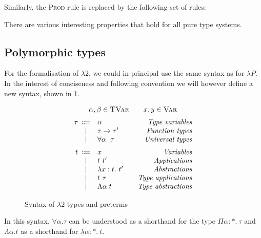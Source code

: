Similarly, the \textsc{Prod} rule is replaced by the following set of rules:
\begin{center}
    \begin{prooftreecustom}
    \end{prooftreecustom}
\end{center}\vspace{1mm}

There are various interesting properties that hold for all pure type systems.


\subsection{Polymorphic types}
For the formalisation of $\lambda 2$, we could in principal use the same syntax as for $\lambda P$.
In the interest of conciseness and following convention we will however define a new syntax,
shown in \cref{fig:polymorphic-types-terms-syntax}.

\begin{figure}[htbp]
    \[
    \begin{array}{r@{\hspace{.5em}}cl@{\hspace{2em}}r}
        \multicolumn{4}{c}{\alpha, \beta \in \textsc{TVar} \quad\quad x,y \in \textsc{Var}} \br
        \tau & \Coloneqq & \alpha & \emph{Type variables} \\
        & | & \tau \to \tau' & \emph{Function types} \\
        & | & \forall \alpha.\ \tau & \emph{Universal types} \br
        t & \Coloneqq & x & \emph{Variables} \\
        & | & t\ t' & \emph{Applications} \\
        & | & \lambda x: t.\ t' & \emph{Abstractions} \\
        & | & t\ \tau & \emph{Type applications} \\
        & | & \Lambda \alpha. t & \emph{Type abstractions}
    \end{array}
    \]
    \caption{Syntax of $\lambda 2$ types and preterms}
    \label{fig:polymorphic-types-terms-syntax}
\end{figure}

In this syntax, $\forall \alpha. \tau$ can be understood as a shorthand for the type
$\Pi \alpha : \ast.\ \tau$ and $\Lambda \alpha. t$ as a shorthand for $\lambda \alpha : \ast.\ t$.

